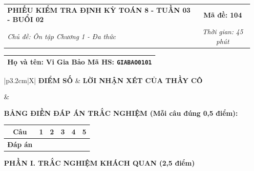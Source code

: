 \documentclass[12pt,a4paper]{article}
\begin{document}
\newpage


\noindent
\begin{tabularx}{\linewidth}{|X|c|}
\hline
\textbf{PHIẾU KIỂM TRA ĐỊNH KỲ TOÁN 8 - TUẦN 03 - BUỔI 02} & \textbf{Mã đề: 104} \\
\textit{Chủ đề: Ôn tập Chương 1 - Đa thức} & \textit{Thời gian: 45 phút} \\
\hline
\end{tabularx}

\vspace{1mm}

\noindent
\begin{tabularx}{\linewidth}{|X|}
\hline
\rule[-2mm]{0pt}{7.5mm}\textbf{Họ và tên:} \textbf{\large Vi Gia Bảo} \hfill \textbf{Mã HS:} \texttt{GIABAO0101} \quad \\
\hline
\end{tabularx}

\vspace{1mm}

\noindent
\begin{tabularx}{\linewidth}{|p{3.2cm}|X|}
\hline
\centering\textbf{ĐIỂM SỐ} & \centering\textbf{LỜI NHẬN XÉT CỦA THẦY CÔ} \tabularnewline
\hline
\rule{0pt}{1.3cm} & \tabularnewline
\hline
\end{tabularx}

\vspace{1.2mm}

\noindent\textbf{BẢNG ĐIỀN ĐÁP ÁN TRẮC NGHIỆM (Mỗi câu đúng 0,5 điểm):}
\vspace{0.8mm}

\noindent
\renewcommand{\arraystretch}{1.35}
\begin{tabularx}{\linewidth}{|c|*{5}{>{\centering\arraybackslash}X|}}
\hline
\textbf{Câu} & \textbf{1} & \textbf{2} & \textbf{3} & \textbf{4} & \textbf{5} \\
\hline
\textbf{Đáp án} & & & & & \\
\hline
\end{tabularx}
\renewcommand{\arraystretch}{1.0}

\vspace{1.5mm}

\noindent\textbf{\large PHẦN I. TRẮC NGHIỆM KHÁCH QUAN (2,5 điểm)}
\vspace{1mm}
\end{document}
